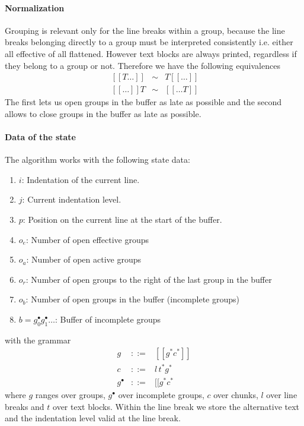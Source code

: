 \documentclass[12pt]{article}
\begin{document}
\paragraph{Normalization}
Grouping is relevant only for the line breaks within a group, because the line
breaks belonging directly to a group must be interpreted consistently
i.e. either all effective of all flattened. However text blocks are always
printed, regardless if they belong to a group or not. Therefore we have the
following equivalences
$$
\begin{array}{lll}
  \ [\![T \ldots]\!] &\sim&  T [\![\ldots]\!]
  \\
  \ [\![\ldots]\!] T &\sim&  [\![\ldots T]\!]

\end{array}
$$
%
The first lets us open groups in the buffer as late as possible and the second
allows to close groups in the buffer as late as possible.


\paragraph{Data of the state} The algorithm works with the following state
data:
\begin{enumerate}
\item $i$: Indentation of the current line.

\item $j$: Current indentation level.

\item $p$: Position on the current line at the start of the buffer.

\item $o_e$: Number of open effective groups

\item $o_a$: Number of open active groups

\item $o_r$: Number of open groups to the right of the last group in the
  buffer

\item $o_b$: Number of open groups in the buffer (incomplete groups)

\item $b = g^\bullet_0 g^\bullet_1 \ldots$: Buffer of incomplete groups
\end{enumerate}
%
with the grammar
$$
\begin{array}{lll}
  g & ::= & [\![ g^* c^* ]\!]
  \\
  c & ::= & l\, t^* g^*
  \\
  g^\bullet & ::= & [\![ g^* c^*
\end{array}
$$
where $g$ ranges over groups, $g^\bullet$ over incomplete groups,
$c$ over chunks, $l$ over line breaks and
$t$ over text blocks. Within the line break we store the alternative text and
the indentation level valid at the line break.
\end{document}
